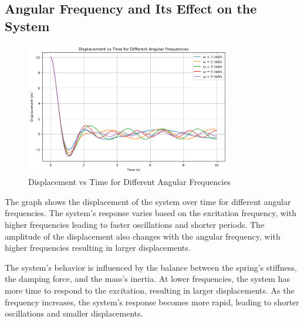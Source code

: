 \documentclass[12pt,a4paper]{article}
\begin{document}
{\vspace{10pt}}

\subsection{Angular Frequency and Its Effect on the System}
\begin{figure}[H]
    \centering
    \includegraphics[width=0.8\textwidth]{angular_freq_effect_on_system.png} 
    \caption{Displacement vs Time for Different Angular Frequencies}
    \label{fig:system}
\end{figure}
{\vspace{10pt}}


The graph shows the displacement of the system over time for different angular frequencies. The system's response varies based on the excitation frequency, with higher frequencies leading to faster oscillations and shorter periods. The amplitude of the displacement also changes with the angular frequency, with higher frequencies resulting in larger displacements.

The system's behavior is influenced by the balance between the spring's stiffness, the damping force, and the mass's inertia. At lower frequencies, the system has more time to respond to the excitation, resulting in larger displacements. As the frequency increases, the system's response becomes more rapid, leading to shorter oscillations and smaller displacements.



{\vspace{10pt}}
\end{document}
